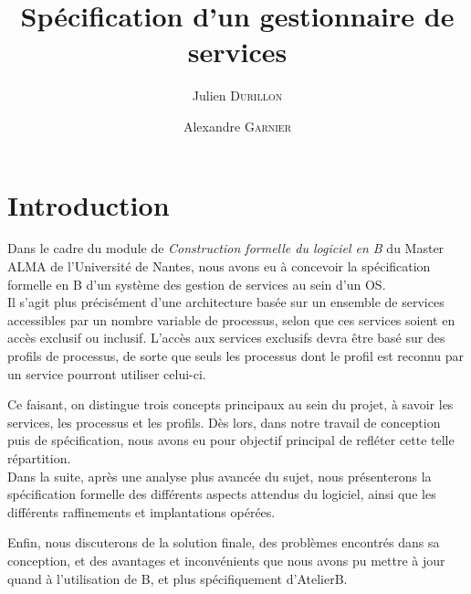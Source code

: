 \documentclass[french, 11pt, a4paper]{article}
\author{Julien \textsc{Durillon} \and Alexandre \textsc{Garnier}}
\title{Spécification d'un gestionnaire de services}
\begin{document}
\maketitle

\section{Introduction}

Dans le cadre du module de \emph{Construction formelle du logiciel en B} du
Master ALMA de l'Université de Nantes, nous avons eu à concevoir la
spécification formelle en B d'un système des gestion de services au sein d'un
OS.\\

Il s'agit plus précisément d'une architecture basée sur un ensemble de services
accessibles par un nombre variable de processus, selon que ces services soient
en accès exclusif ou inclusif. L'accès aux services exclusifs devra être basé
sur des profils de processus, de sorte que seuls les processus dont le profil
est reconnu par un service pourront utiliser celui-ci.

Ce faisant, on distingue trois concepts principaux au sein du projet, à savoir
les services, les processus et les profils. Dès lors, dans notre travail de
conception puis de spécification, nous avons eu pour objectif principal de
refléter cette telle répartition.\\

Dans la suite, après une analyse plus avancée du sujet, nous présenterons la
spécification formelle des différents aspects attendus du logiciel, ainsi que
les différents raffinements et implantations opérées.

Enfin, nous discuterons de la solution finale, des problèmes encontrés dans sa
conception, et des avantages et inconvénients que nous avons pu mettre à jour
quand à l'utilisation de B, et plus spécifiquement d'AtelierB.

\section{}
\end{document}
